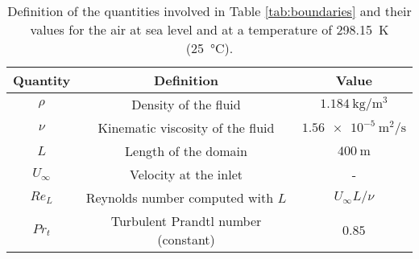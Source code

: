 \begin{subappendices}
	\begin{table}
		\caption[Definition of characteristic quantities.]{Definition of the quantities involved in Table \ref{tab:boundaries} and their values for the air at sea level and at a temperature of \SI{298.15}{\kelvin} (\SI{25}{\degreeCelsius}).}
		\centering
		\begin{tabular}{ccc}
			\toprule
			Quantity & Definition & Value \\
			\midrule
			$\rho$ & Density of the fluid & $\SI{1.184}{\kilogram\per\cubic\meter}$ \\
			$\nu$ & Kinematic viscosity of the fluid & $\SI{1.56e-5}{\square\meter\per\second}$ \\
			$L$ & Length of the domain & $\SI{400}{\meter}$ \\
			$U_\infty$ & Velocity at the inlet & - \\
			$Re_L$ & Reynolds number computed with $L$ & $U_\infty L/\nu$ \\
			$Pr_t$ & Turbulent Prandtl number (constant) & $0.85$ \\
			\bottomrule
		\end{tabular}
		\label{tab:bound_quant}
	\end{table}
	

\end{subappendices}
